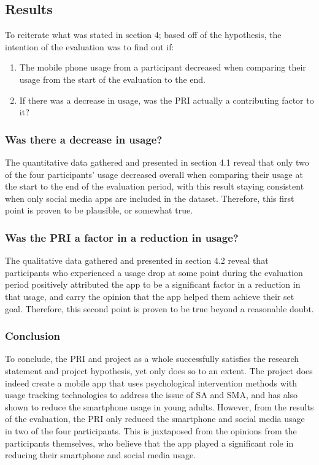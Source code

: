 \documentclass[12pt]{article}
\begin{document}
\subsection{Results}
To reiterate what was stated in section 4; based off of the hypothesis, the intention of the evaluation was to find out if:

\begin{enumerate}
	\item The mobile phone usage from a participant decreased when comparing their usage from the start of the evaluation to the end.
	\item If there was a decrease in usage, was the PRI actually a contributing factor to it?
\end{enumerate}

\subsubsection{Was there a decrease in usage?}
The quantitative data gathered and presented in section 4.1 reveal that only two of the four participants' usage decreased overall when comparing their usage at the start to the end of 
the evaluation period, with this result staying consistent when only social media apps are included in the dataset. Therefore, this first point is proven to be plausible, or somewhat true.

\subsubsection{Was the PRI a factor in a reduction in usage?}
The qualitative data gathered and presented in section 4.2 reveal that participants who experienced a usage drop at some point during the evaluation period positively attributed the app to be 
a significant factor in a reduction in that usage, and carry the opinion that the app helped them achieve their set goal. Therefore, this second point is proven to be true beyond a reasonable
doubt.

\subsubsection{Conclusion}
To conclude, the PRI and project as a whole successfully satisfies the research statement and project hypothesis, yet only does so to an extent. The project does indeed create a mobile app that 
uses psychological intervention methods with usage tracking technologies to address the issue of SA and SMA, and has also shown to reduce the smartphone usage in young adults. However, from the 
results of the evaluation, the PRI only reduced the smartphone and social media usage in two of the four participants. This is juxtaposed from the opinions from the participants themselves, who 
believe that the app played a significant role in reducing their smartphone and social media usage.
\end{document}
